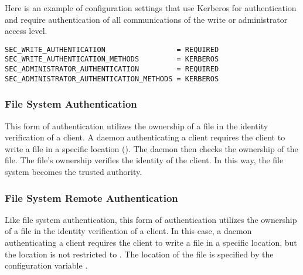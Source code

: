 Here is
an example of configuration settings that use Kerberos for
authentication and require authentication of all communications
of the write or administrator access level.
\footnotesize
\begin{verbatim}
SEC_WRITE_AUTHENTICATION                 = REQUIRED
SEC_WRITE_AUTHENTICATION_METHODS         = KERBEROS
SEC_ADMINISTRATOR_AUTHENTICATION         = REQUIRED
SEC_ADMINISTRATOR_AUTHENTICATION_METHODS = KERBEROS
\end{verbatim}
\normalsize

\subsubsection{\label{sec:FS-Authentication}File System Authentication}

This form of authentication utilizes the ownership of a file
in the identity verification of a client.
A daemon authenticating a client requires the client to write
a file in a specific location ().
The daemon then checks the ownership of the file.
The file's ownership verifies the identity of the client.
In this way, the file system becomes the trusted authority.

\subsubsection{\label{sec:FSR-Authentication}File System Remote Authentication}
Like file system authentication,
this form of authentication utilizes the ownership of a file
in the identity verification of a client.
In this case,
a daemon authenticating a client requires the client to write
a file in a specific location,
but the location is not restricted to .
The location of the file is specified by the configuration
variable .



